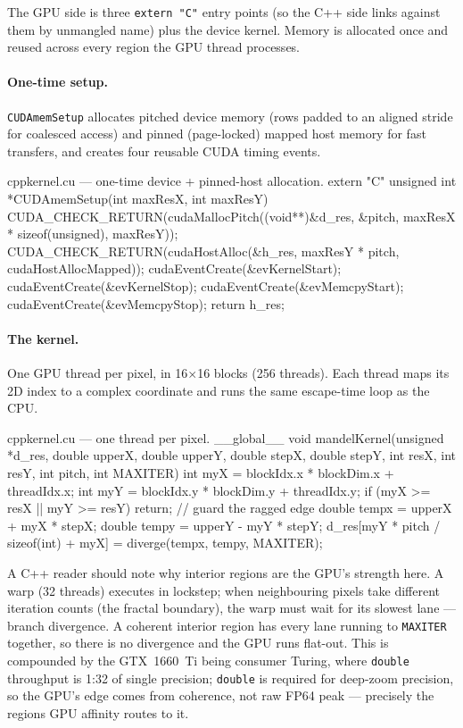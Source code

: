 \documentclass[
	english,
	letterpaper, oneside
]{article}
\begin{document}
The GPU side is three \texttt{extern "C"} entry points (so the C++ side links
against them by unmangled name) plus the device kernel. Memory is allocated once
and reused across every region the GPU thread processes.

\paragraph{One-time setup.} \texttt{CUDAmemSetup} allocates pitched device
memory (rows padded to an aligned stride for coalesced access) and pinned
(page-locked) mapped host memory for fast transfers, and creates four reusable
CUDA timing events.

\begin{sourcecode}{cpp}{kernel.cu --- one-time device + pinned-host allocation.}
extern "C" unsigned int *CUDAmemSetup(int maxResX, int maxResY) {
  CUDA_CHECK_RETURN(cudaMallocPitch((void**)&d_res, &pitch,
                                    maxResX * sizeof(unsigned), maxResY));
  CUDA_CHECK_RETURN(cudaHostAlloc(&h_res, maxResY * pitch, cudaHostAllocMapped));
  cudaEventCreate(&evKernelStart);  cudaEventCreate(&evKernelStop);
  cudaEventCreate(&evMemcpyStart);  cudaEventCreate(&evMemcpyStop);
  return h_res;
}
\end{sourcecode}

\paragraph{The kernel.} One GPU thread per pixel, in 16$\times$16 blocks (256
threads). Each thread maps its 2D index to a complex coordinate and runs the same
escape-time loop as the CPU.

\begin{sourcecode}{cpp}{kernel.cu --- one thread per pixel.}
__global__ void mandelKernel(unsigned *d_res, double upperX, double upperY,
                             double stepX, double stepY, int resX, int resY,
                             int pitch, int MAXITER) {
  int myX = blockIdx.x * blockDim.x + threadIdx.x;
  int myY = blockIdx.y * blockDim.y + threadIdx.y;
  if (myX >= resX || myY >= resY) return;          // guard the ragged edge
  double tempx = upperX + myX * stepX;
  double tempy = upperY - myY * stepY;
  d_res[myY * pitch / sizeof(int) + myX] = diverge(tempx, tempy, MAXITER);
}
\end{sourcecode}

A C++ reader should note why interior regions are the GPU's strength here.
A warp (32 threads) executes in lockstep; when neighbouring pixels take different
iteration counts (the fractal boundary), the warp must wait for its slowest lane
--- branch divergence. A coherent interior region has every lane running to
\texttt{MAXITER} together, so there is no divergence and the GPU runs flat-out.
This is compounded by the GTX~1660~Ti being consumer Turing, where \texttt{double}
throughput is 1:32 of single precision; \texttt{double} is required for deep-zoom
precision, so the GPU's edge comes from coherence, not raw FP64 peak --- precisely
the regions GPU affinity routes to it.
\end{document}
